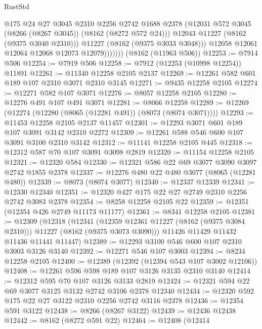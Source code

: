 \begin{lexlean}{RustStd}
\begin{coremodule}
                      @175
                      @24
                      @27
                      @3045
                      @2310
                      @2256
                      @2742
                      @1688
                      @2378
                      (@12031 @572 @3045 (@8266 (@8267 @3045)) (@8162 (@8272 @572 @24)))
                      @12043
                      @11227
                      (@8162 (@9375 @3040 @2310)))
                    @11227
                    (@8162 (@9375 @3033 @3048)))
                  @12058
                  @12061
                  @12064
                  @12068
                  @12073
                  @12079)))))))
    (@8162 (@11963 @506))
@12253 := @7914 @506
@12254 := @7919 @506
@12258 := @7912 (@12253 (@10998 @12254)) @11891
@12261 := @11340 @12258 @2105 @2137
@12269 := @12261 @582 @601 @189 @107 @2310 @3071 @2310 @3145
@12271 := @9435 @12258 @2105
@12274 := @12271 @582 @107 @3071
@12276 := @8057 @12258 @2105
@12280 := @12276 @491 @107 @491 @3071
@12281 := @8066 @12258
@12289 := @12269 (@12274 (@12280 (@8065 (@12281 @491)) (@8073 (@8074 @3071))))
@12293 := @11453 @12258 @2105 @2137 @11457
@12301 := @12293 @3071 @601 @189 @107 @3091 @3142 @2310 @2272
@12309 := @12261 @588 @546 @600 @107 @3091 @3100 @2310 @3142
@12312 := @11141 @12258 @2105 @445
@12318 := @12312 @587 @70 @107 @3091 @3098 @2819
@12320 := @11154 @12258 @2105
@12321 := @12320 @584
@12330 := @12321 @586 @22 @69 @3077 @3090 @3097 @2742 @1855 @2378
@12337 := @12276 @480 @22 @480 @3077 (@8065 (@12281 @480))
@12339 := @8073 (@8074 @3077)
@12340 := @12337 @12339
@12341 := @12330 @12340
@12351 := @12320 @427 @175 @22 @27 @2749 @2310 @2256 @2742 @3083 @2378
@12354 := @8258 @12258 @2105 @22
@12359 := @12351 (@12354 @426 @2749 @11173 @11177)
@12361 := @8341 @12258 @2105
@12381 := @12309
    (@12318
      (@12341 (@12359 @12361 @11227 (@8162 (@9375 @3084 @2310))) @11227 (@8162 (@9375 @3073 @3090)))
      @11426
      @11429
      @11432
      @11436
      @11441
      @11447)
@12389 := @12293 @3100 @546 @600 @107 @2310 @3003 @3126 @3140
@12392 := @12271 @546 @107 @3003
@12394 := @8234 @12258 @2105
@12400 := @12389 (@12392 (@12394 @543 @107 @3002 @12106))
@12408 := @12261 @596 @598 @189 @107 @3126 @3135 @2310 @3140
@12414 := @12312 @595 @70 @107 @3126 @3133 @2819
@12424 := @12321 @594 @22 @69 @3077 @3125 @3132 @2742 @3106 @2378 @12340
@12434 := @12320 @592 @175 @22 @27 @3122 @2310 @2256 @2742 @3116 @2378
@12436 := @12354 @591 @3122
@12438 := @8266 (@8267 @3122)
@12439 := @12436 @12438
@12442 := @8162 (@8272 @591 @22)
@12464 := @12408
    (@12414

\end{coremodule}
\end{lexlean}
